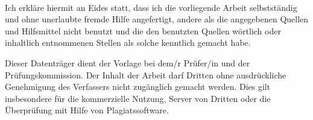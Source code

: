 {\ }
\vfill

\begin{flushleft}
	Ich erkläre hiermit an Eides statt, dass ich die vorliegende Arbeit
	selbstständig und ohne unerlaubte fremde Hilfe angefertigt, andere als die
	angegebenen Quellen und Hilfsmittel nicht benutzt und die den benutzten
	Quellen wörtlich oder inhaltlich entnommenen Stellen als solche kenntlich
	gemacht habe.

	Dieser Datenträger dient der Vorlage bei dem/r Prüfer/in und der
	Prüfungskommission. Der Inhalt der Arbeit darf Dritten ohne ausdrückliche
	Genehmigung des Verfassers nicht zugänglich gemacht werden. Dies gilt
	insbesondere für die kommerzielle Nutzung, Server von Dritten oder die
	Überprüfung mit Hilfe von Plagiatssoftware.
\end{flushleft}

\vspace*{2cm}
\vspace*{4cm}
